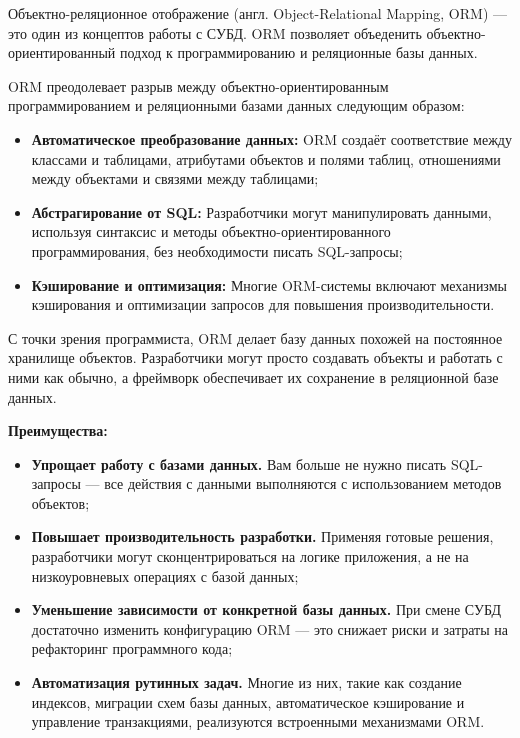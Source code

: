
    Объектно-реляционное отображение (англ. Object-Relational Mapping, ORM) — это один из концептов работы с СУБД. ORM позволяет объеденить объектно-ориентированный подход к программированию и реляционные базы данных.


        ORM преодолевает разрыв между объектно-ориентированным программированием и реляционными базами данных следующим образом:

        \begin{itemize}
            \item \textbf{Автоматическое преобразование данных:} ORM создаёт соответствие между классами и таблицами, атрибутами объектов и полями таблиц, отношениями между объектами и связями между таблицами;
            
            \item \textbf{Абстрагирование от SQL:} Разработчики могут манипулировать данными, используя синтаксис и методы объектно-ориентированного программирования, без необходимости писать SQL-запросы;
            
            \item \textbf{Кэширование и оптимизация:} Многие ORM-системы включают механизмы кэширования и оптимизации запросов для повышения производительности.
        \end{itemize}

        С точки зрения программиста, ORM делает базу данных похожей на постоянное хранилище объектов. Разработчики могут просто создавать объекты и работать с ними как обычно, а фреймворк обеспечивает их сохранение в реляционной базе данных.


        \textbf{Преимущества:}
        \begin{itemize}
            \item \textbf{Упрощает работу с базами данных.} Вам больше не нужно писать SQL-запросы — все действия с данными выполняются с использованием методов объектов;
            \item \textbf{Повышает производительность разработки.} Применяя готовые решения, разработчики могут сконцентрироваться на логике приложения, а не на низкоуровневых операциях с базой данных;
            \item \textbf{Уменьшение зависимости от конкретной базы данных.} При смене СУБД достаточно изменить конфигурацию ORM — это снижает риски и затраты на рефакторинг программного кода;
            \item \textbf{Автоматизация рутинных задач.} Многие из них, такие как создание индексов, миграции схем базы данных, автоматическое кэширование и управление транзакциями, реализуются встроенными механизмами ORM.
        \end{itemize}

